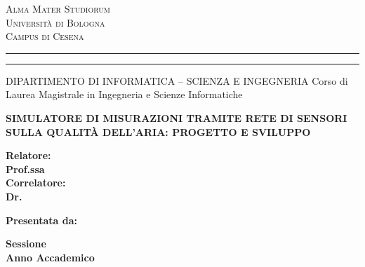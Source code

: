 
\oddsidemargin=25pt

\begin{titlepage}
\begin{center}
{
	{\Large{\textsc{Alma Mater Studiorum}}}\\
	{\Large{\textsc{Universit\`a di Bologna}}} \\
	{\textsc{Campus di Cesena}}
	\rule[0.1cm]{14cm}{0.1mm}
	\rule[0.5cm]{14cm}{0.6mm}
	DIPARTIMENTO DI INFORMATICA – SCIENZA E INGEGNERIA
	Corso di Laurea Magistrale in Ingegneria e Scienze Informatiche
}
\end{center}
\vspace{15mm}
\begin{center}
{\LARGE{\bf SIMULATORE DI MISURAZIONI TRAMITE RETE DI SENSORI SULLA QUALITÀ DELL'ARIA: PROGETTO E SVILUPPO}}
\end{center}
\vspace{40mm}
\par
\noindent
\begin{minipage}[t]{0.47\textwidth}
{\large{\bf Relatore:\\Prof.ssa \xsupervisor}}
\vspace{5mm}
{\large{\bf \\Correlatore:\\Dr. \xcorrelatore}}
\end{minipage}
\hfill
\begin{minipage}[t]{0.47\textwidth}\raggedleft
{\large{\bf Presentata da:\\\xstudent}}
\end{minipage}
\vspace{20mm}
\begin{center}
{\large{\bf Sessione \xsession\\Anno Accademico \xaccademicyear}}
\end{center}
\end{titlepage}